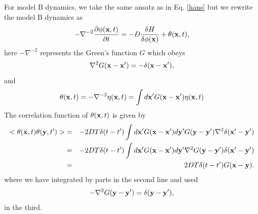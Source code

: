For model B dynamics, we take the same ansatz as in Eq. \eqref{hans} but we rewrite the model B dynamics as
\begin{equation}
    -\nabla^{-2} \frac{\partial\phi({\bf x},t)}{\partial t} = -D \frac{\delta H}{\delta \phi({\bf x})}+ 
    \theta({\bf x},t),
\end{equation}
here $-\nabla^{-2}$ represents the Green's function $G$ which obeys 
\begin{equation}
    \nabla^2 G({\bf x}-{\bf x'}) = -\delta({\bf x}-{\bf x}'),
\end{equation}
and 
\begin{equation}
    \theta({\bf x},t)=-\nabla^{-2}\eta({\bf x},t)= \int d{\bf x}'G({\bf x}-{\bf x'})\eta({\bf x},t)
\end{equation}
The correlation function of $\theta({\bf x},t)$ is given by
\begin{eqnarray}
< \theta({\bf x},t)\theta({\bf y},t')> &=&-2DT\delta(t-t') \int d{\bf x}'G({\bf x}-{\bf x'})d{\bf y}'G({\bf y}-{\bf y'})\nabla^2\delta({\bf x}'-{\bf y}') \\
&=& -2DT\delta(t-t') \int d{\bf x}'G({\bf x}-{\bf x'})d{\bf y}'\nabla^2G({\bf y}-{\bf y'})\delta({\bf x}'-{\bf y}') \\
&=& 2DT\delta(t-t') G({\bf x}-{\bf y}).
\end{eqnarray}
where we have integrated by parts in the second line and used 
\begin{equation}
    -\nabla^2G({\bf y}-{\bf y'})= \delta({\bf y}-{\bf y}'),
\end{equation}
in the third.

